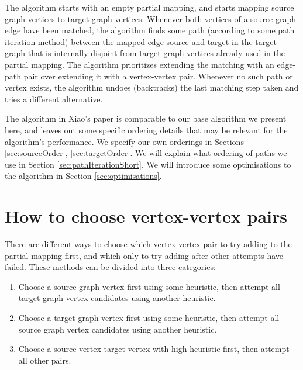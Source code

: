 The algorithm starts with an empty partial mapping, and starts mapping source graph vertices to target graph vertices. Whenever both vertices of a source graph edge have been matched, the algorithm finds some path (according to some path iteration method) between the mapped edge source and target in the target graph that is internally disjoint from target graph vertices already used in the partial mapping. The algorithm prioritizes extending the matching with an edge-path pair over extending it with a vertex-vertex pair. Whenever no such path or vertex exists, the algorithm undoes (backtracks) the last matching step taken and tries a different alternative. %

The algorithm in Xiao's paper is comparable to our base algorithm we present here, and leaves out some specific ordering details that may be relevant for the algorithm's performance. We specify our own orderings in Sections \ref{sec:sourceOrder}, \ref{sec:targetOrder}. We will explain what ordering of paths we use in Section \ref{sec:pathIterationShort}. We will introduce some optimisations to the algorithm in Section \ref{sec:optimisations}.

\section{How to choose vertex-vertex pairs}
There are different ways to choose which vertex-vertex pair to try adding to the partial mapping first, and which only to try adding after other attempts have failed. These methods can be divided into three categories:

\begin{enumerate}
\item Choose a source graph vertex first using some heuristic, then attempt all target graph vertex candidates using another heuristic.
\item Choose a target graph vertex first using some heuristic, then attempt all source graph vertex candidates using another heuristic.
\item Choose a source vertex-target vertex with high heuristic first, then attempt all other pairs.
\end{enumerate}

